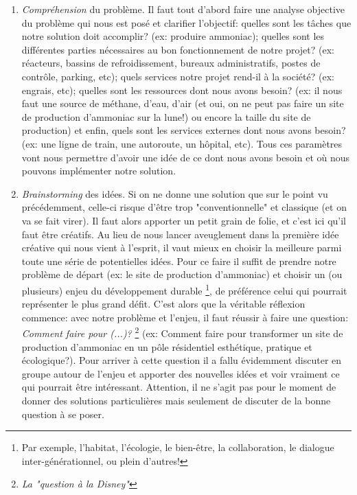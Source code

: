 \begin{enumerate}

\item \textit{Compréhension} du problème. Il faut tout d'abord faire une analyse objective du problème qui nous est posé et clarifier l'objectif: quelles sont les tâches que notre solution doit accomplir? (ex: produire ammoniac); quelles sont les différentes parties nécessaires au bon fonctionnement de notre projet? (ex: réacteurs, bassins de refroidissement, bureaux administratifs, postes de contrôle, parking, etc); quels services notre projet rend-il à la société? (ex: engrais, etc); quelles sont les ressources dont nous avons besoin? (ex: il nous faut une source de méthane, d'eau, d'air (et oui, on ne peut pas faire un site de production d'ammoniac sur la lune!) ou encore la taille du site de production) et enfin, quels sont les services externes dont nous avons besoin? (ex: une ligne de train, une autoroute, un hôpital, etc). Tous ces paramètres vont nous permettre d'avoir une idée de ce dont nous avons besoin et où nous pouvons implémenter notre solution.

\item \textit{Brainstorming} des idées. Si on ne donne une solution que sur le point vu précédemment, celle-ci risque d’être trop "conventionnelle" et classique (et on va se fait virer). Il faut alors apporter un petit grain de folie, et c'est ici qu'il faut être créatifs. Au lieu de nous lancer aveuglement dans la première idée créative qui nous vient à l'esprit, il vaut mieux en choisir la meilleure parmi toute une série de potentielles idées. Pour ce faire il suffit de prendre notre problème de départ (ex: le site de production d'ammoniac) et choisir un (ou plusieurs) enjeu du développement durable \footnote{Par exemple, l'habitat, l’écologie, le bien-être, la collaboration, le dialogue inter-générationnel, ou plein d'autres!}, de préférence celui qui pourrait représenter le plus grand défit. C'est alors que la véritable réflexion commence: avec notre problème et l'enjeu, il faut réussir à faire une question: \textit{Comment faire pour (...)?} \footnote{\textit{La "question à la Disney"}} (ex: Comment faire pour transformer un site de production d'ammoniac en un pôle résidentiel esthétique, pratique et écologique?). Pour arriver à cette question il a fallu évidemment discuter en groupe autour de l'enjeu et apporter des nouvelles idées et voir vraiment ce qui pourrait être intéressant. Attention, il ne s'agit pas pour le moment de donner des solutions particulières mais seulement de discuter de la bonne question à se poser.


\end{enumerate}
